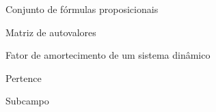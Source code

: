 
\begin{simbolos}
  \item[$\Gamma$] Conjunto de fórmulas proposicionais
  \item[$\Lambda$] Matriz de autovalores
  \item[$\zeta$] Fator de amortecimento de um sistema dinâmico
  \item[$\in$] Pertence
  \item[\$] Subcampo
\end{simbolos}

